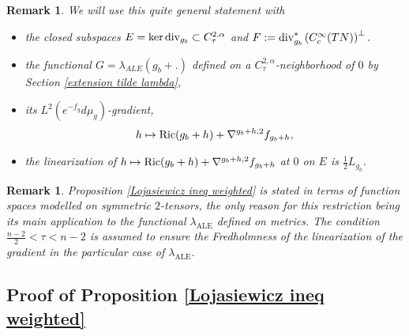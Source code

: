 \documentclass[a4paper,11pt,reqno]{amsart}
\newtheorem{rk}[defn]{Remark}
\def\Ric{\mathop{\rm Ric}\nolimits}
\def\div{\mathop{\rm div}\nolimits}
\def\Ric{\mathop{\rm Ric}\nolimits}
\def\div{\mathop{\rm div}\nolimits}
\numberwithin{equation}{section}
\begin{document}
	\begin{rk}
		We will use this quite general statement with
		\begin{itemize}
			\item the closed subspaces $E = \ker\div_{g_b}\subset C^{2,\alpha}_{\tau}$ and $F:=\div_{g_b}^{\ast}\left(C^{\infty}_c(TN)\right)^{\perp}.$
			\item the functional $G={\lambda}_{ALE}(g_b +.)$ defined on a $C^{2,\alpha}_\tau$-neighborhood of $0$ by Section \ref{extension tilde lambda},
			\item its $L^2(e^{-f_g}d\mu_g)$-gradient, $$h\mapsto\Ric(g_b+h) + \nabla^{g_b+h,2}f_{g_b+h},$$
			\item the linearization of $h\mapsto\Ric(g_b+h) + \nabla^{g_b+h,2}f_{g_b+h}$ at $0$ on $E$ is $\frac{1}{2}L_{g_b}$.
		\end{itemize}
	\end{rk}
	\begin{rk}
		Proposition \ref{Lojasiewicz ineq weighted} is stated in terms of function spaces modelled on symmetric $2$-tensors, the only reason for this restriction being its main application to the functional $\lambda_{\operatorname{ALE}}$ defined on metrics. The condition $\frac{n-2}{2}<\tau< n-2$ is assumed to ensure the Fredholmness of the linearization of the gradient in the particular case of $\lambda_{\operatorname{ALE}}$.
	\end{rk}

	
	\subsection{Proof of Proposition \ref{Lojasiewicz ineq weighted}}\label{sec-prop-loja-ineq}~~\\
	
\end{document}
